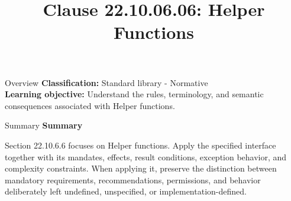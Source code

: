 \documentclass[10pt,letterpaper]{article}
\title{Clause 22.10.06.06: Helper Functions}
\author{}
\date{}
\begin{document}
\maketitle
\begin{CornellOverviewBox}{Overview}
\textbf{Classification:} Standard library - Normative\\[2pt]
\textbf{Learning objective:} Understand the rules, terminology, and semantic consequences associated with Helper functions.
\end{CornellOverviewBox}\begin{CornellSummaryBox}{Summary}
{\sffamily\bfseries\color{Accent} Summary}\par\vspace{3pt}Section 22.10.6.6 focuses on Helper functions. Apply the specified interface together with its mandates, effects, result conditions, exception behavior, and complexity constraints. When applying it, preserve the distinction between mandatory requirements, recommendations, permissions, and behavior deliberately left undefined, unspecified, or implementation-defined.
\end{CornellSummaryBox}
\end{document}

